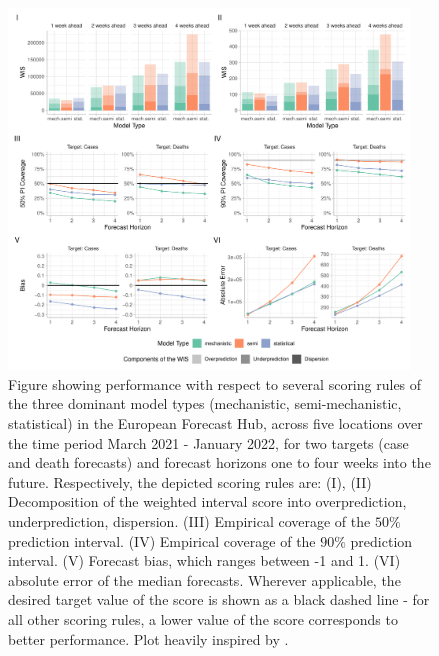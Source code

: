 \begin{figure}
\centering
\includegraphics[width = 0.95\textwidth]{../plots/overall_assessment_model_types.pdf}
\caption{Figure showing performance with respect to several scoring rules of the three dominant model types (mechanistic, semi-mechanistic, statistical) in the European Forecast Hub, across five locations over the time period March 2021 - January 2022, for two targets (case and death forecasts) and forecast horizons one to four weeks into the future. Respectively, the depicted scoring rules are: (I), (II) Decomposition of the weighted interval score into overprediction, underprediction, dispersion. (III) Empirical coverage of the $50\%$ prediction interval. (IV) Empirical coverage of the $90\%$ prediction interval. (V) Forecast bias, which ranges between -1 and 1. (VI) absolute error of the median forecasts. Wherever applicable, the desired target value of the score is shown as a black dashed line - for all other scoring rules, a lower value of the score corresponds to better performance. Plot heavily inspired by \cite{bosse_comparing_2021}. }
\label{fig:decomp_model_types}
\end{figure}
